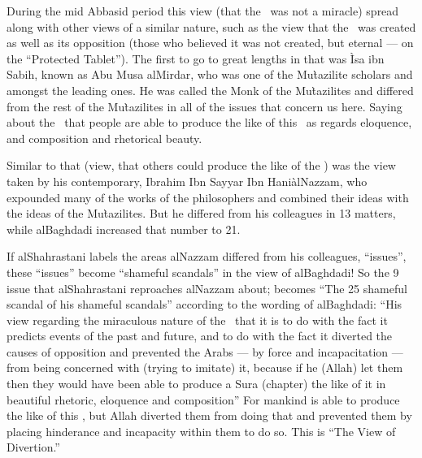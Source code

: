 \documentclass[12pt]{memoir}
\begin{document}

During the mid Abbasid period this view (that the \Quran\ was not a miracle)
spread along with other views of a similar nature,
such as the view that the \Quran\ was created as well as its opposition
(those who believed it was not created, but eternal —
on the “Protected Tablet”).
The first to go to great lengths in that was \`Isa ibn Sabih,
known as Abu Musa al\–Mirdar, who was one of
the Mu\`tazilite scholars and amongst the leading ones.
He was called the Monk of the Mu\`tazilites
and differed from the rest of the Mu\`tazilites in all of
the issues that concern us here.
Saying about the \Quran\ that people are able
to produce the like of this \Quran\ as regards eloquence,
and composition and rhetorical beauty\fnmark.


Similar to that (view, that others could produce the like of the \Quran) was
the view taken by his contemporary, Ibrahim Ibn Sayyar Ibn Hani\` al\–Nazzam,
who expounded many of the works of the philosophers and
combined their ideas with the ideas of the Mu\`tazilites\fnmark.
But he differed from his colleagues in 13 matters,
while al\–Baghdadi increased that number to 21.


If al\–Shahrastani labels the areas al\–Nazzam differed from his colleagues,
“issues”, these “issues” become “shameful scandals”
in the view of al\–Baghdadi!
So the 9 issue that al\–Shahrastani reproaches al\–Nazzam about;
becomes “The 25 shameful scandal of his shameful scandals”
according to the wording of al\–Baghdadi:
“His view regarding the miraculous nature of the \Quran\ that it is
to do with the fact it predicts events of the past and future, and to do with
the fact it diverted the causes of opposition and prevented the Arabs — by
force and incapacitation — from being concerned with (trying to imitate) it,
because if he (Allah) let them then they would have been able to produce a Sura
(chapter) the like of it in beautiful rhetoric, eloquence and composition” For
mankind is able to produce the like of this \Quran, but Allah diverted them
from doing that and prevented them by placing hinderance and incapacity within
them to do so. This is “The View of Divertion.”\fnmark
\end{document}
